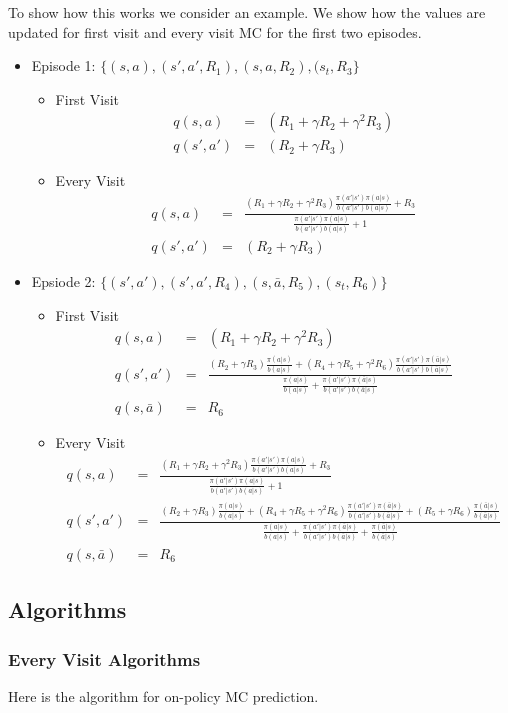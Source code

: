 \documentclass[11pt,a4paper]{article}
\newcommand\bea{\begin{eqnarray}}
\newcommand\eea{\end{eqnarray}}
\begin{document}
To show how this works we consider an example. We show how the values are updated for first visit and every visit MC for the first two episodes. 
\begin{itemize}
\item Episode 1: $\{(s,a),(s',a',R_1),(s,a,R_2),(s_t,R_3\}$ 
\begin{itemize}
\item First Visit
\bea
q(s,a) &=& (R_1 + \gamma R_2+\gamma^2 R_3) \\
q(s',a') &=& (R_2 + \gamma R_3)
\eea
\item Every Visit
\bea
q(s,a) &=& \frac{(R_1 + \gamma R_2+\gamma^2 R_3) \frac{\pi(a'|s') \pi(a|s)}{b(a'|s') b(a|s)}+R_3}{\frac{\pi(a'|s') \pi(a|s)}{b(a'|s') b(a|s)}+1} \\
q(s',a') &=& (R_2 + \gamma R_3) 
\eea
\end{itemize}
\item  Epsiode 2: $\{(s',a'),(s',a',R_4),(s,\bar a,R_5),(s_t,R_6)\}$
\begin{itemize}
\item First Visit
\bea
q(s,a) &=& (R_1 + \gamma R_2+\gamma^2 R_3)  \\
q(s',a') &=& \frac{(R_2 + \gamma R_3) \frac{\pi(a|s)}{b(a|s)} + (R_4 + \gamma R_5 + \gamma^2 R_6) \frac{\pi(a'|s') \pi(\bar a|s)}{b(a'|s') b(\bar a|s)}}{ \frac{\pi(a|s)}{b(a|s)} + \frac{\pi(a'|s') \pi(\bar a|s)}{b(a'|s') b(\bar a|s)}} \\
q(s,\bar a) &=& R_6
\eea
\item Every Visit
\bea
q(s,a) &=& \frac{(R_1 + \gamma R_2+\gamma^2 R_3) \frac{\pi(a'|s') \pi(a|s)}{b(a'|s') b(a|s)}+R_3}{\frac{\pi(a'|s') \pi(a|s)}{b(a'|s') b(a|s)}+1} \\
q(s',a') &=& \frac{(R_2 + \gamma R_3) \frac{\pi(a|s)}{b(a|s)} + (R_4 + \gamma R_5 + \gamma^2 R_6) \frac{\pi(a'|s') \pi(\bar a|s)}{b(a'|s') b(\bar a|s)} + (R_5+ \gamma R_6)  \frac{ \pi(\bar a|s)}{ b(\bar a|s)}}{\frac{\pi(a|s)}{b(a|s)} + \frac{\pi(a'|s') \pi(\bar a|s)}{b(a'|s') b(\bar a|s)} +\frac{ \pi(\bar a|s)}{ b(\bar a|s)}} \\
q(s,\bar a) &=& R_6
\eea
\end{itemize}
\end{itemize}

\subsection{Algorithms}

\subsubsection{Every Visit Algorithms}
Here is the algorithm for on-policy MC prediction.
\end{document}
